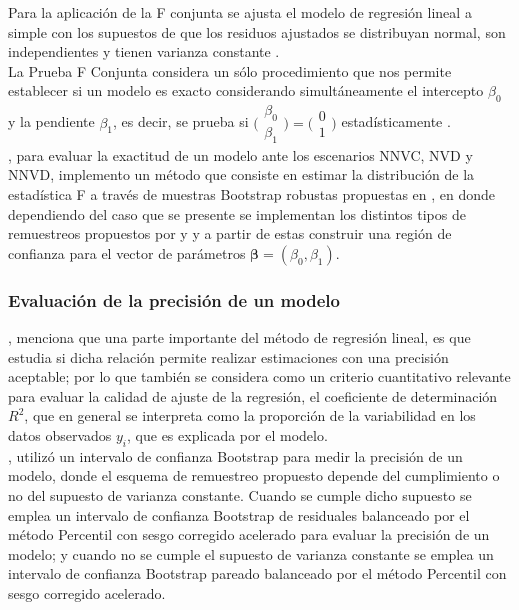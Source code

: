 Para la aplicación de la F conjunta se ajusta el modelo de regresión lineal a simple con los supuestos de que los residuos ajustados se distribuyan normal, son independientes y tienen varianza constante \parencite{ayala-2024}.\\

La Prueba F Conjunta considera un sólo procedimiento que nos permite establecer si un modelo es exacto considerando simultáneamente el intercepto \(\beta_0\) y la pendiente \(\beta_1\), es decir, se prueba si  {\Large $\bigl(\begin{smallmatrix} \beta_{0} \\ \beta_{1} \end{smallmatrix}\bigr) = \bigl(\begin{smallmatrix}0  \\  1\end{smallmatrix}\bigr) $} estadísticamente \parencite{zacarias-2023}.\\

\textcite{zacarias-2023}, para evaluar la exactitud de un modelo ante los escenarios NNVC, NVD y NNVD, implemento un método que consiste en estimar la distribución de la estadística F a través de muestras Bootstrap robustas propuestas en \textcite{rana-2012}, en donde dependiendo del caso que se presente se implementan los distintos tipos de remuestreos propuestos por \textcite{wu-1986} y \textcite{liu-1988} y a partir de estas construir una región de confianza para el vector de parámetros $ \mathbf{\beta} = (\beta_{0}, \beta_{1})$.\\


\subsubsection{Evaluación de la precisión de un modelo}

\textcite{zacarias-2023}, menciona que una parte importante del método de regresión lineal, es que estudia si dicha relación permite realizar estimaciones con una precisión aceptable; por lo que también se considera como un criterio cuantitativo relevante para evaluar la calidad de ajuste de la regresión, el coeficiente de determinación $R^{2}$, que en general se interpreta como la proporción de la variabilidad en los datos observados $y_{i}$, que es explicada por el modelo.\\


\textcite{balam-2012}, utilizó un intervalo de confianza Bootstrap para medir la precisión de un modelo, donde el esquema de remuestreo propuesto depende del cumplimiento o no del supuesto de varianza constante. Cuando se cumple dicho supuesto se emplea un intervalo de confianza Bootstrap de residuales balanceado por el método Percentil con sesgo corregido acelerado para evaluar la precisión de un modelo; y cuando no se cumple el supuesto de varianza constante se emplea un intervalo de confianza Bootstrap pareado balanceado por el método Percentil con sesgo corregido acelerado.\\

